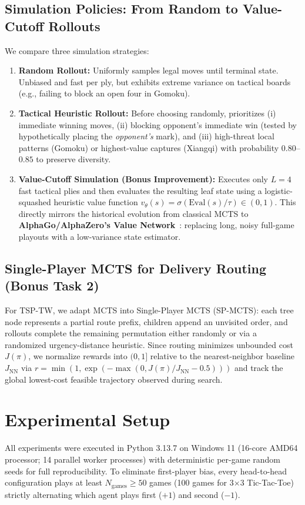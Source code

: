 \documentclass[conference]{IEEEtran}
\begin{document}
\subsection{Simulation Policies: From Random to Value-Cutoff Rollouts}
We compare three simulation strategies:
\begin{enumerate}
    \item \textbf{Random Rollout:} Uniformly samples legal moves until terminal state. Unbiased and fast per ply, but exhibits extreme variance on tactical boards (e.g., failing to block an open four in Gomoku).
    \item \textbf{Tactical Heuristic Rollout:} Before choosing randomly, prioritizes (i) immediate winning moves, (ii) blocking opponent's immediate win (tested by hypothetically placing the \emph{opponent's} mark), and (iii) high-threat local patterns (Gomoku) or highest-value captures (Xiangqi) with probability $0.80$--$0.85$ to preserve diversity.
    \item \textbf{Value-Cutoff Simulation (Bonus Improvement):} Executes only $L=4$ fast tactical plies and then evaluates the resulting leaf state using a logistic-squashed heuristic value function $v_\theta(s) = \sigma(\mathrm{Eval}(s) / \tau) \in (0, 1)$. This directly mirrors the historical evolution from classical MCTS to \textbf{AlphaGo/AlphaZero's Value Network}~\cite{silver2016,silver2017}: replacing long, noisy full-game playouts with a low-variance state estimator.
\end{enumerate}

\subsection{Single-Player MCTS for Delivery Routing (Bonus Task 2)}
For TSP-TW, we adapt MCTS into Single-Player MCTS (SP-MCTS): each tree node represents a partial route prefix, children append an unvisited order, and rollouts complete the remaining permutation either randomly or via a randomized urgency-distance heuristic. Since routing minimizes unbounded cost $J(\pi)$, we normalize rewards into $(0,1]$ relative to the nearest-neighbor baseline $J_{\text{NN}}$ via $r = \min(1, \exp(-\max(0, J(\pi)/J_{\text{NN}} - 0.5)))$ and track the global lowest-cost feasible trajectory observed during search.

\section{Experimental Setup}
All experiments were executed in Python 3.13.7 on Windows 11 (16-core AMD64 processor; 14 parallel worker processes) with deterministic per-game random seeds for full reproducibility. To eliminate first-player bias, every head-to-head configuration plays at least $N_{\text{games}} \ge 50$ games (100 games for 3$\times$3 Tic-Tac-Toe) strictly alternating which agent plays first ($+1$) and second ($-1$).
\end{document}
